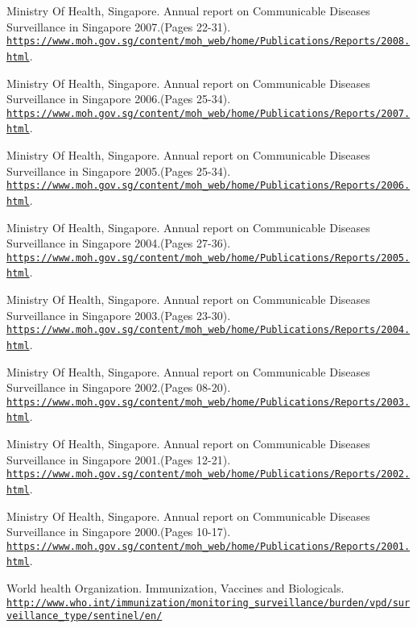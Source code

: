 \documentclass[11pt]{exam}
\begin{document}
\begin{thebibliography}{28}
Ministry Of Health, Singapore. Annual report on Communicable Diseases Surveillance in Singapore 2007.(Pages 22-31).
\\\texttt{\url{https://www.moh.gov.sg/content/moh_web/home/Publications/Reports/2008.html}}.

Ministry Of Health, Singapore. Annual report on Communicable Diseases Surveillance in Singapore 2006.(Pages 25-34).
\\\texttt{\url{https://www.moh.gov.sg/content/moh_web/home/Publications/Reports/2007.html}}.

Ministry Of Health, Singapore. Annual report on Communicable Diseases Surveillance in Singapore 2005.(Pages 25-34).
\\\texttt{\url{https://www.moh.gov.sg/content/moh_web/home/Publications/Reports/2006.html}}.

Ministry Of Health, Singapore. Annual report on Communicable Diseases Surveillance in Singapore 2004.(Pages 27-36).
\\\texttt{\url{https://www.moh.gov.sg/content/moh_web/home/Publications/Reports/2005.html}}.

Ministry Of Health, Singapore. Annual report on Communicable Diseases Surveillance in Singapore 2003.(Pages 23-30).
\\\texttt{\url{https://www.moh.gov.sg/content/moh_web/home/Publications/Reports/2004.html}}.

Ministry Of Health, Singapore. Annual report on Communicable Diseases Surveillance in Singapore 2002.(Pages 08-20).
\\\texttt{\url{https://www.moh.gov.sg/content/moh_web/home/Publications/Reports/2003.html}}.

Ministry Of Health, Singapore. Annual report on Communicable Diseases Surveillance in Singapore 2001.(Pages 12-21).
\\\texttt{\url{https://www.moh.gov.sg/content/moh_web/home/Publications/Reports/2002.html}}.

Ministry Of Health, Singapore. Annual report on Communicable Diseases Surveillance in Singapore 2000.(Pages 10-17).
\\\texttt{\url{https://www.moh.gov.sg/content/moh_web/home/Publications/Reports/2001.html}}.

World health Organization. Immunization, Vaccines and Biologicals.
\\\texttt{\url{http://www.who.int/immunization/monitoring_surveillance/burden/vpd/surveillance_type/sentinel/en/}}


\end{thebibliography}
\end{document}
